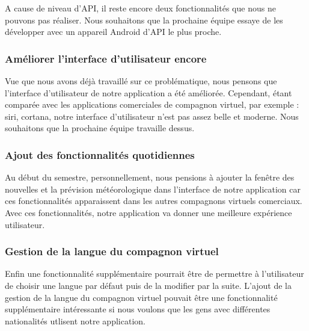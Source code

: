 \indent A cause de niveau d'API, il reste encore deux fonctionnalités que nous ne pouvons pas réaliser. Nous souhaitons que la prochaine équipe essaye de les développer avec un appareil Android d'API le plus proche.

\subsubsection{Améliorer l'interface d'utilisateur encore}

\indent Vue que nous avons déjà travaillé sur ce problématique, nous pensons que l'interface d'utilisateur de notre application a été améliorée. Cependant, étant comparée avec les applications comerciales de compagnon virtuel, par exemple : siri, cortana, notre interface d'utilisateur n'est pas assez belle et moderne. Nous souhaitons que la prochaine équipe travaille dessus.

\subsubsection{Ajout des fonctionnalités quotidiennes}

\indent Au début du semestre, personnellement, nous pensions à ajouter la fenêtre des nouvelles et la prévision météorologique dans l'interface de notre application car ces fonctionnalités apparaissent dans les autres compagnons virtuels comerciaux. Avec ces fonctionnalités, notre application va donner une meilleure expérience utilisateur.

\subsubsection{Gestion de la langue du compagnon virtuel}

\indent Enfin une fonctionnalité supplémentaire pourrait être de permettre à l'utilisateur de choisir une langue par défaut puis de la modifier par la suite. L'ajout de la gestion de la langue du compagnon virtuel pouvait être une fonctionnalité supplémentaire intéressante si nous voulons que les gens avec différentes nationalités utlisent notre application.
\newpage
